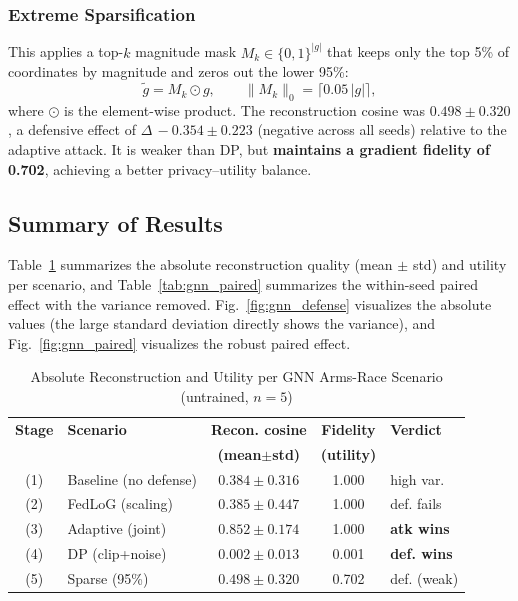 \documentclass[conference]{IEEEtran}
\begin{document}
\subsubsection{Extreme Sparsification}
This applies a top-$k$ magnitude mask $M_k\in\{0,1\}^{|g|}$ that keeps only the
top 5\% of coordinates by magnitude and zeros out the lower 95\%:
\begin{equation}
\tilde{g}=M_k\odot g,\qquad
\|M_k\|_0 = \lceil 0.05\,|g|\rceil ,
\label{eq:sparse}
\end{equation}
where $\odot$ is the element-wise product. The reconstruction cosine was
\textbf{$0.498\pm0.320$}, a defensive effect of $\Delta\,{-}0.354\pm0.223$
(negative across all seeds) relative to the adaptive attack. It is weaker than
DP, but \textbf{maintains a gradient fidelity of 0.702}, achieving a better
privacy--utility balance.

\subsection{Summary of Results}
Table~\ref{tab:gnn_abs} summarizes the absolute reconstruction quality
(mean $\pm$ std) and utility per scenario, and Table~\ref{tab:gnn_paired}
summarizes the within-seed paired effect with the variance removed.
Fig.~\ref{fig:gnn_defense} visualizes the absolute values (the large standard
deviation directly shows the variance), and Fig.~\ref{fig:gnn_paired} visualizes
the robust paired effect.

\begin{table}[!t]
\caption{Absolute Reconstruction and Utility per GNN Arms-Race Scenario
(untrained, $n{=}5$)}
\label{tab:gnn_abs}
\centering
\footnotesize
\begin{tabular}{@{}clccl@{}}
\toprule
\textbf{Stage} & \textbf{Scenario} & \textbf{Recon. cosine} & \textbf{Fidelity} & \textbf{Verdict} \\
 & & \textbf{(mean$\pm$std)} & \textbf{(utility)} & \\
\midrule
(1) & Baseline (no defense) & $0.384\pm0.316$ & 1.000 & high var. \\
(2) & FedLoG (scaling) & $0.385\pm0.447$ & 1.000 & def. fails \\
(3) & Adaptive (joint) & $\mathbf{0.852\pm0.174}$ & 1.000 & \textbf{atk wins} \\
(4) & DP (clip+noise) & $\mathbf{0.002\pm0.013}$ & 0.001 & \textbf{def. wins} \\
(5) & Sparse (95\%) & $0.498\pm0.320$ & 0.702 & def. (weak) \\
\bottomrule
\end{tabular}
\end{table}
\end{document}
